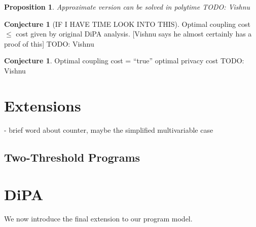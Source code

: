 \documentclass[12pt]{article}
\newtheorem{prop}[thm]{Proposition}
\theoremstyle{definition}
\newtheorem{conj}[thm]{Conjecture}
\begin{document}
\begin{prop}
    Approximate version can be solved in polytime
    TODO: Vishnu
\end{prop}

\begin{conj}[IF I HAVE TIME LOOK INTO THIS]
    Optimal coupling cost $\leq$ cost given by original DiPA analysis. [Vishnu says he almost certainly has a proof of this]
    TODO: Vishnu
\end{conj}

\begin{conj}
    Optimal coupling cost = ``true'' optimal privacy cost
    TODO: Vishnu
\end{conj}


\section{Extensions}

- brief word about counter, maybe the simplified multivariable case

\subsection{Two-Threshold Programs}

\noindent\hrulefill

\section{DiPA}

We now introduce the final extension to our program model. 
\end{document}
